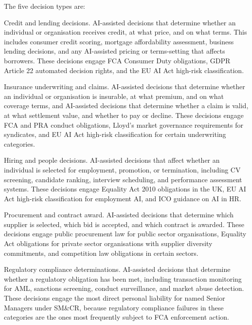 The five decision types are:

Credit and lending decisions. AI-assisted decisions that determine whether an individual or organisation receives credit, at what price, and on what terms. This includes consumer credit scoring, mortgage affordability assessment, business lending decisions, and any AI-assisted pricing or terms-setting that affects borrowers. These decisions engage FCA Consumer Duty obligations, GDPR Article 22 automated decision rights, and the EU AI Act high-risk classification.

Insurance underwriting and claims. AI-assisted decisions that determine whether an individual or organisation is insurable, at what premium, and on what coverage terms, and AI-assisted decisions that determine whether a claim is valid, at what settlement value, and whether to pay or decline. These decisions engage FCA and PRA conduct obligations, Lloyd's market governance requirements for syndicates, and EU AI Act high-risk classification for certain underwriting categories.

Hiring and people decisions. AI-assisted decisions that affect whether an individual is selected for employment, promotion, or termination, including CV screening, candidate ranking, interview scheduling, and performance assessment systems. These decisions engage Equality Act 2010 obligations in the UK, EU AI Act high-risk classification for employment AI, and ICO guidance on AI in HR.

Procurement and contract award. AI-assisted decisions that determine which supplier is selected, which bid is accepted, and which contract is awarded. These decisions engage public procurement law for public sector organisations, Equality Act obligations for private sector organisations with supplier diversity commitments, and competition law obligations in certain sectors.

Regulatory compliance determinations. AI-assisted decisions that determine whether a regulatory obligation has been met, including transaction monitoring for AML, sanctions screening, conduct surveillance, and market abuse detection. These decisions engage the most direct personal liability for named Senior Managers under SM\&CR, because regulatory compliance failures in these categories are the ones most frequently subject to FCA enforcement action.

